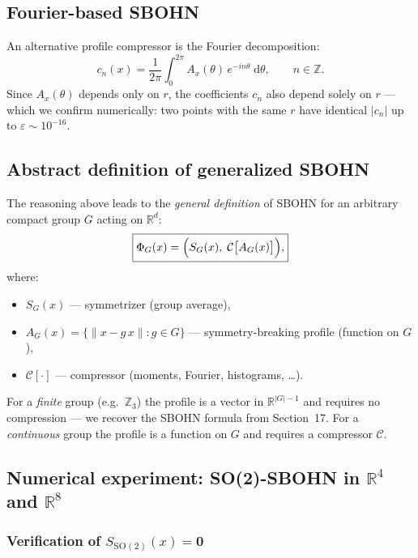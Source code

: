 \documentclass[11pt,a4paper]{report}
\begin{document}
\subsection{Fourier-based SBOHN}

An alternative profile compressor is the Fourier decomposition:
\[
  c_n(x)=\frac{1}{2\pi}\int_0^{2\pi}A_x(\theta)\,e^{-in\theta}\;\mathrm{d}\theta,
  \qquad n\in\mathbb{Z}.
\]
Since $A_x(\theta)$ depends only on $r$, the coefficients $c_n$ also depend solely on $r$ --- which we confirm numerically: two points with the same $r$ have identical $|c_n|$ up to $\varepsilon\sim 10^{-16}$.

\subsection{Abstract definition of generalized SBOHN}

The reasoning above leads to the \emph{general definition} of SBOHN for an arbitrary compact group $G$ acting on $\mathbb{R}^d$:
\[
\boxed{
  \Phi_G(x)
  =\Bigl(S_G(x),\;\mathcal{C}\bigl[A_G(x)\bigr]\Bigr),
}
\]
where:
\begin{itemize}
  \item $S_G(x)$ --- symmetrizer (group average),
  \item $A_G(x)=\{\|x-g\,x\|:g\in G\}$ --- symmetry-breaking profile (function on $G$),
  \item $\mathcal{C}[\cdot]$ --- compressor (moments, Fourier, histograms, \ldots).
\end{itemize}

For a \emph{finite} group (e.g.\ $\mathbb{Z}_3$) the profile is a vector in $\mathbb{R}^{|G|-1}$ and requires no compression --- we recover the SBOHN formula from Section~17. For a \emph{continuous} group the profile is a function on $G$ and requires a compressor $\mathcal{C}$.

\subsection{Numerical experiment: SO(2)-SBOHN in $\mathbb{R}^4$ and $\mathbb{R}^8$}

\subsubsection{Verification of $S_{\mathrm{SO}(2)}(x)=\mathbf{0}$}

\noindent{}
\end{document}
